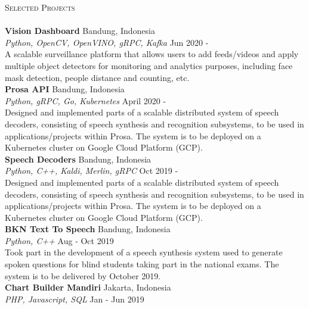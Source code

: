 \documentclass[a4paper]{article}
\newcommand{\lineunder} {
    \vspace*{-8pt} \\
    \hspace*{-18pt} \hrulefill \\
}
\newcommand{\header} [1] {
    {\hspace*{-18pt}\vspace*{6pt} \textsc{#1}}
    \vspace*{-6pt} \lineunder
}
\begin{document}
\header{Selected Projects}
\vspace{2mm}
{\textbf{Vision Dashboard}} \hfill Bandung, Indonesia \\
{\sl Python, OpenCV, OpenVINO, gRPC, Kafka} \hfill Jun 2020 - \\
\vspace{1mm}
A scalable surveillance platform that allows users to add feeds/videos and apply
multiple object detectors for monitoring and analytics purposes, including face
mask detection, people distance and counting, etc.\\
\vspace*{3mm}
{\textbf{Prosa API}} \hfill Bandung, Indonesia \\
{\sl Python, gRPC, Go, Kubernetes} \hfill April 2020 - \\
\vspace{1mm}
Designed and implemented parts of a scalable distributed system of speech
decoders, consisting of speech synthesis and recognition subsystems, to be used
in applications/projects within Prosa. The system is to be deployed on a
Kubernetes cluster on Google Cloud Platform (GCP).\\
\vspace*{3mm}
{\textbf{Speech Decoders}} \hfill Bandung, Indonesia \\
{\sl Python, C++, Kaldi, Merlin, gRPC} \hfill Oct 2019 - \\
\vspace{1mm}
Designed and implemented parts of a scalable distributed system of speech
decoders, consisting of speech synthesis and recognition subsystems, to be used
in applications/projects within Prosa. The system is to be deployed on a
Kubernetes cluster on Google Cloud Platform (GCP).\\
\vspace*{3mm}
{\textbf{BKN Text To Speech}} \hfill Bandung, Indonesia \\
{\sl Python, C++} \hfill Aug - Oct 2019 \\
\vspace*{1mm}
Took part in the development of a speech synthesis system used to generate
spoken questions for blind students taking part in the national exams. The
system is to be delivered by October 2019.\\
\vspace*{3mm}
{\textbf{Chart Builder Mandiri}} \hfill Jakarta, Indonesia \\
{\sl PHP, Javascript, SQL} \hfill Jan - Jun 2019 \\
\end{document}
